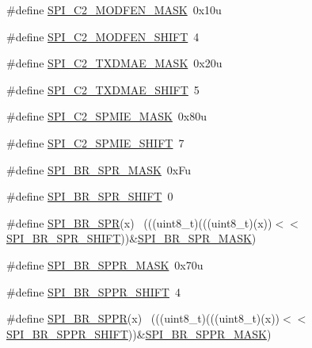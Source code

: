 \begin{DoxyCompactItemize}
\#define \hyperlink{group___s_p_i___register___masks_ga447f4723c0ee7499e14bea6cd0c8d3ac}{S\+P\+I\+\_\+\+C2\+\_\+\+M\+O\+D\+F\+E\+N\+\_\+\+M\+A\+SK}~0x10u
\item 
\#define \hyperlink{group___s_p_i___register___masks_ga7e2e1a75667ba2896d6056f5f886dec5}{S\+P\+I\+\_\+\+C2\+\_\+\+M\+O\+D\+F\+E\+N\+\_\+\+S\+H\+I\+FT}~4
\item 
\#define \hyperlink{group___s_p_i___register___masks_ga847c4ae3f2f0aed59df609ca39afb483}{S\+P\+I\+\_\+\+C2\+\_\+\+T\+X\+D\+M\+A\+E\+\_\+\+M\+A\+SK}~0x20u
\item 
\#define \hyperlink{group___s_p_i___register___masks_gaf1162ea05678ca446ca23d5e7ae0bc1f}{S\+P\+I\+\_\+\+C2\+\_\+\+T\+X\+D\+M\+A\+E\+\_\+\+S\+H\+I\+FT}~5
\item 
\#define \hyperlink{group___s_p_i___register___masks_ga734ac5ba36a5402f92dd9ecf15a7a87b}{S\+P\+I\+\_\+\+C2\+\_\+\+S\+P\+M\+I\+E\+\_\+\+M\+A\+SK}~0x80u
\item 
\#define \hyperlink{group___s_p_i___register___masks_ga33a757ba520cab426978fbfc57957b5b}{S\+P\+I\+\_\+\+C2\+\_\+\+S\+P\+M\+I\+E\+\_\+\+S\+H\+I\+FT}~7
\item 
\#define \hyperlink{group___s_p_i___register___masks_gaac7263560f1cc81f8f3fb6a7089d5c26}{S\+P\+I\+\_\+\+B\+R\+\_\+\+S\+P\+R\+\_\+\+M\+A\+SK}~0x\+Fu
\item 
\#define \hyperlink{group___s_p_i___register___masks_ga49ebd0e5e9751438bc3968877baf2661}{S\+P\+I\+\_\+\+B\+R\+\_\+\+S\+P\+R\+\_\+\+S\+H\+I\+FT}~0
\item 
\#define \hyperlink{group___s_p_i___register___masks_ga79b87245a1a7c0f454e35ee449d6be35}{S\+P\+I\+\_\+\+B\+R\+\_\+\+S\+PR}(x)                                                    ~(((uint8\+\_\+t)(((uint8\+\_\+t)(x))$<$$<$\hyperlink{group___s_p_i___register___masks_ga49ebd0e5e9751438bc3968877baf2661}{S\+P\+I\+\_\+\+B\+R\+\_\+\+S\+P\+R\+\_\+\+S\+H\+I\+FT}))\&\hyperlink{group___s_p_i___register___masks_gaac7263560f1cc81f8f3fb6a7089d5c26}{S\+P\+I\+\_\+\+B\+R\+\_\+\+S\+P\+R\+\_\+\+M\+A\+SK})
\item 
\#define \hyperlink{group___s_p_i___register___masks_gaf3ca4981d609aac2f31d89c677192f7a}{S\+P\+I\+\_\+\+B\+R\+\_\+\+S\+P\+P\+R\+\_\+\+M\+A\+SK}~0x70u
\item 
\#define \hyperlink{group___s_p_i___register___masks_gac53e7d34efb934fe3232632a77301ca3}{S\+P\+I\+\_\+\+B\+R\+\_\+\+S\+P\+P\+R\+\_\+\+S\+H\+I\+FT}~4
\item 
\#define \hyperlink{group___s_p_i___register___masks_gaa3474c0f016e5c6e41e6b28a80dadf1b}{S\+P\+I\+\_\+\+B\+R\+\_\+\+S\+P\+PR}(x)                                                  ~(((uint8\+\_\+t)(((uint8\+\_\+t)(x))$<$$<$\hyperlink{group___s_p_i___register___masks_gac53e7d34efb934fe3232632a77301ca3}{S\+P\+I\+\_\+\+B\+R\+\_\+\+S\+P\+P\+R\+\_\+\+S\+H\+I\+FT}))\&\hyperlink{group___s_p_i___register___masks_gaf3ca4981d609aac2f31d89c677192f7a}{S\+P\+I\+\_\+\+B\+R\+\_\+\+S\+P\+P\+R\+\_\+\+M\+A\+SK})

\end{DoxyCompactItemize}
